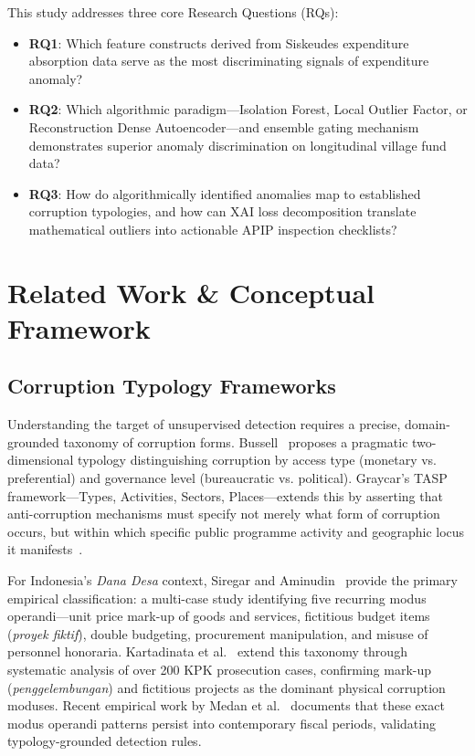 \documentclass[runningheads]{llncs}
\begin{document}
This study addresses three core Research Questions (RQs):
\begin{itemize}
    \item \textbf{RQ1}: Which feature constructs derived from Siskeudes expenditure absorption data serve as the most discriminating signals of expenditure anomaly?
    \item \textbf{RQ2}: Which algorithmic paradigm---Isolation Forest, Local Outlier Factor, or Reconstruction Dense Autoencoder---and ensemble gating mechanism demonstrates superior anomaly discrimination on longitudinal village fund data?
    \item \textbf{RQ3}: How do algorithmically identified anomalies map to established corruption typologies, and how can XAI loss decomposition translate mathematical outliers into actionable APIP inspection checklists?
\end{itemize}

\section{Related Work \& Conceptual Framework}

\subsection{Corruption Typology Frameworks}
Understanding the target of unsupervised detection requires a precise, domain-grounded taxonomy of corruption forms. Bussell~\cite{ref4} proposes a pragmatic two-dimensional typology distinguishing corruption by access type (monetary vs. preferential) and governance level (bureaucratic vs. political). Graycar's TASP framework---Types, Activities, Sectors, Places---extends this by asserting that anti-corruption mechanisms must specify not merely what form of corruption occurs, but within which specific public programme activity and geographic locus it manifests~\cite{ref7}.

For Indonesia's \textit{Dana Desa} context, Siregar and Aminudin~\cite{ref13} provide the primary empirical classification: a multi-case study identifying five recurring modus operandi---unit price mark-up of goods and services, fictitious budget items (\textit{proyek fiktif}), double budgeting, procurement manipulation, and misuse of personnel honoraria. Kartadinata et al.~\cite{ref14} extend this taxonomy through systematic analysis of over 200 KPK prosecution cases, confirming mark-up (\textit{penggelembungan}) and fictitious projects as the dominant physical corruption moduses. Recent empirical work by Medan et al.~\cite{ref15} documents that these exact modus operandi patterns persist into contemporary fiscal periods, validating typology-grounded detection rules.
\end{document}
